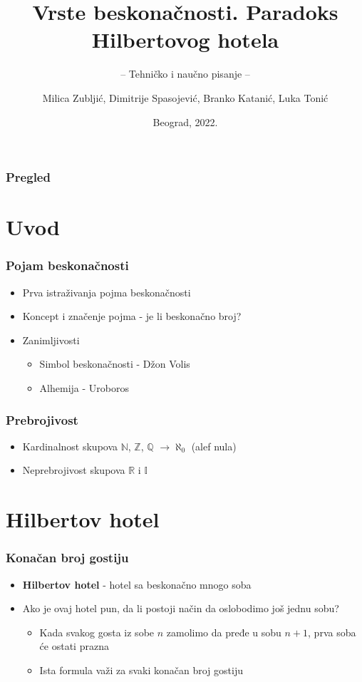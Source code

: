 \documentclass{beamer}
\title{Vrste beskonačnosti. Paradoks Hilbertovog hotela}
\subtitle{-- Tehničko i naučno pisanje --}
\author{Milica Zubljić, Dimitrije Spasojević, Branko Katanić, Luka Tonić}
\institute{Matematički fakultet\\Univerzitet u Beogradu}
\date{
	\footnotesize{Beograd, 2022.}	
}
\begin{document}
\begin{frame}
	\thispagestyle{empty}
	\titlepage
\end{frame}

\addtocounter{framenumber}{-1}

\begin{frame}
	\frametitle{Pregled} 
	\tableofcontents[hidesubsections] 
\end{frame}

\section{Uvod}
\begin{frame}
    \frametitle{Pojam beskonačnosti}
    \begin{itemize}
        \item Prva istraživanja pojma beskonačnosti
        \item Koncept i značenje pojma - je li beskonačno broj?
        \item Zanimljivosti
        \begin{itemize}
            \item Simbol beskonačnosti - Džon Volis
            \item Alhemija - Uroboros
        \end{itemize}
    \end{itemize}
\end{frame}

\begin{frame}
    \frametitle{Prebrojivost}
    \begin{itemize}
        \item Kardinalnost skupova $\mathbb{N}$, $\mathbb{Z}$, $\mathbb{Q}$ $\rightarrow \aleph_{0}$ (alef nula)
        \item Neprebrojivost skupova $\mathbb{R}$ i $\mathbb{I}$
    \end{itemize}
\end{frame}

\section{Hilbertov hotel}
\begin{frame}[fragile]\frametitle{Konačan broj gostiju}
\begin{itemize}
    \item \textbf{Hilbertov hotel} - hotel sa beskonačno mnogo soba
    \item Ako je ovaj hotel pun, da li postoji način da oslobodimo još jednu sobu?
    \begin{itemize}
        \item Kada svakog gosta iz sobe $n$ zamolimo da pređe u sobu $n+1$, prva soba će ostati prazna
        \item Ista formula važi za svaki konačan broj gostiju
    \end{itemize}
\end{itemize}
\end{frame}
\end{document}
